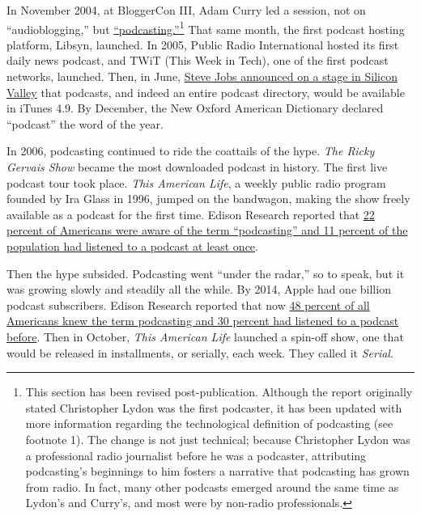 \documentclass[notoc, symmetric, nobib, nols]{towcenter-guideto-book}
\begin{document}
In November 2004, at BloggerCon III, Adam Curry led a session, not on ``audioblogging,'' but \href{http://web.archive.org/web/20130729212422id_/http://itc.conversationsnetwork.org/shows/detail275.html}{``podcasting.''}\autocite{Solutions}\footnote{This section has been revised post-publication. Although the report originally stated Christopher Lydon was the first podcaster, it has been updated with more information regarding the technological definition of podcasting (see footnote 1). The change is not just technical; because Christopher Lydon was a professional radio journalist before he was a podcaster, attributing podcasting’s beginnings to him fosters a narrative that podcasting has grown from radio. In fact, many other podcasts emerged around the same time as Lydon’s and Curry’s, and most were by non-radio professionals.\autocite{WINER}} That same month, the first podcast hosting platform, Libsyn, launched. In 2005, Public Radio International hosted its first daily news podcast, and TWiT (This Week in Tech), one of the first podcast networks, launched. Then, in June, \href{https://www.youtube.com/watch?v=K0KNLCbzZUw}{Steve Jobs announced on a stage in Silicon Valley} that podcasts, and indeed an entire podcast directory, would be available in iTunes 4.9.\autocite{JobsVideo} By December, the New Oxford American Dictionary declared ``podcast'' the word of the year.\autocite{PCHistoryWiki}

In 2006, podcasting continued to ride the coattails of the hype. \textit{The Ricky Gervais Show} became the most downloaded podcast in history. The first live podcast tour took place.\autocite{PCHistoryWiki} \textit{This American Life}, a weekly public radio program founded by Ira Glass in 1996, jumped on the bandwagon, making the show freely available as a podcast for the first time. Edison Research reported that \href{http://www.edisonresearch.com/the-podcast-consumer-2015/}{22 percent of Americans were aware of the term ``podcasting'' and 11 percent of the population had listened to a podcast at least once}.\autocite{EdPCconsumer}

Then the hype subsided. Podcasting went ``under the radar,'' so to speak, but it was growing slowly and steadily all the while. By 2014, Apple had one billion podcast subscribers. Edison Research reported that now \href{http://www.edisonresearch.com/the-podcast-consumer-2015/}{48 percent of all Americans knew the term podcasting and 30 percent had listened to a podcast before}.\autocite{EdPCconsumer} Then in October, \textit{This American Life} launched a spin-off show, one that would be released in installments, or serially, each week. They called it \textit{Serial}. 
\end{document}
